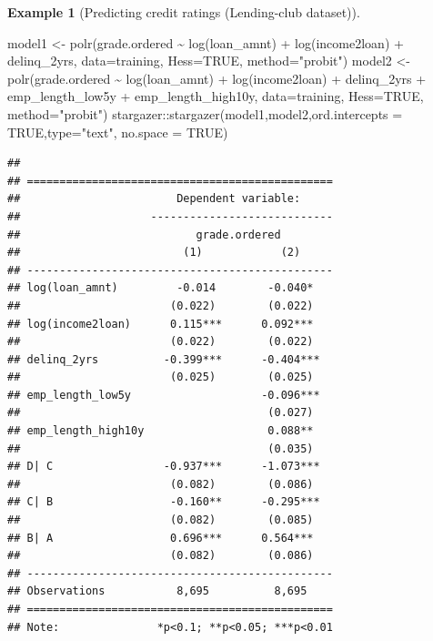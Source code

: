 \documentclass[
  12pt,
]{book}
\newenvironment{Shaded}{\begin{snugshade}}{\end{snugshade}}
\newcommand{\AttributeTok}[1]{\textcolor[rgb]{0.77,0.63,0.00}{#1}}
\newcommand{\ConstantTok}[1]{\textcolor[rgb]{0.00,0.00,0.00}{#1}}
\newcommand{\FunctionTok}[1]{\textcolor[rgb]{0.00,0.00,0.00}{#1}}
\newcommand{\NormalTok}[1]{#1}
\newcommand{\OtherTok}[1]{\textcolor[rgb]{0.56,0.35,0.01}{#1}}
\newcommand{\SpecialCharTok}[1]{\textcolor[rgb]{0.00,0.00,0.00}{#1}}
\newcommand{\StringTok}[1]{\textcolor[rgb]{0.31,0.60,0.02}{#1}}
\theoremstyle{definition}
\theoremstyle{definition}
\newtheorem{example}{Example}[chapter]
\theoremstyle{definition}
\theoremstyle{definition}
\theoremstyle{remark}
\begin{document}
\begin{example}[Predicting credit ratings (Lending-club dataset)]
\begin{Shaded}
\begin{Highlighting}[]
\NormalTok{model1 }\OtherTok{\textless{}{-}} \FunctionTok{polr}\NormalTok{(grade.ordered }\SpecialCharTok{\textasciitilde{}} \FunctionTok{log}\NormalTok{(loan\_amnt) }\SpecialCharTok{+} \FunctionTok{log}\NormalTok{(income2loan) }\SpecialCharTok{+}\NormalTok{ delinq\_2yrs,}
               \AttributeTok{data=}\NormalTok{training, }\AttributeTok{Hess=}\ConstantTok{TRUE}\NormalTok{, }\AttributeTok{method=}\StringTok{"probit"}\NormalTok{)}
\NormalTok{model2 }\OtherTok{\textless{}{-}} \FunctionTok{polr}\NormalTok{(grade.ordered }\SpecialCharTok{\textasciitilde{}} \FunctionTok{log}\NormalTok{(loan\_amnt) }\SpecialCharTok{+} \FunctionTok{log}\NormalTok{(income2loan) }\SpecialCharTok{+}\NormalTok{ delinq\_2yrs }\SpecialCharTok{+}
\NormalTok{                 emp\_length\_low5y }\SpecialCharTok{+}\NormalTok{ emp\_length\_high10y,}
               \AttributeTok{data=}\NormalTok{training, }\AttributeTok{Hess=}\ConstantTok{TRUE}\NormalTok{, }\AttributeTok{method=}\StringTok{"probit"}\NormalTok{)}
\NormalTok{stargazer}\SpecialCharTok{::}\FunctionTok{stargazer}\NormalTok{(model1,model2,}\AttributeTok{ord.intercepts =} \ConstantTok{TRUE}\NormalTok{,}\AttributeTok{type=}\StringTok{"text"}\NormalTok{,}
                     \AttributeTok{no.space =} \ConstantTok{TRUE}\NormalTok{)}
\end{Highlighting}
\end{Shaded}

\begin{verbatim}
## 
## ===============================================
##                        Dependent variable:     
##                    ----------------------------
##                           grade.ordered        
##                         (1)            (2)     
## -----------------------------------------------
## log(loan_amnt)         -0.014        -0.040*   
##                       (0.022)        (0.022)   
## log(income2loan)      0.115***      0.092***   
##                       (0.022)        (0.022)   
## delinq_2yrs          -0.399***      -0.404***  
##                       (0.025)        (0.025)   
## emp_length_low5y                    -0.096***  
##                                      (0.027)   
## emp_length_high10y                   0.088**   
##                                      (0.035)   
## D| C                 -0.937***      -1.073***  
##                       (0.082)        (0.086)   
## C| B                  -0.160**      -0.295***  
##                       (0.082)        (0.085)   
## B| A                  0.696***      0.564***   
##                       (0.082)        (0.086)   
## -----------------------------------------------
## Observations           8,695          8,695    
## ===============================================
## Note:               *p<0.1; **p<0.05; ***p<0.01
\end{verbatim}


\end{example}
\end{document}

